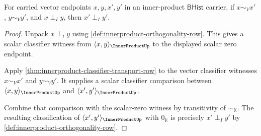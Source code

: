 \begin{theorem}
\label{thm:innerproduct-orthogonality-transport-row}
For carried vector endpoints $x,y,x',y'$ in an inner-product
$\mathsf{BHist}$ carrier, if $x\sim_V x'$, $y\sim_V y'$, and $x\perp_I y$,
then $x'\perp_I y'$.
\end{theorem}
\begin{proof}
Unpack $x\perp_I y$ using
\autoref{def:innerproduct-orthogonality-row}. This gives a scalar classifier
witness from $\langle x,y\rangle_{\InnerProductUp}$ to the displayed scalar
zero endpoint.

Apply \autoref{thm:innerproduct-classifier-transport-row} to the vector
classifier witnesses $x\sim_V x'$ and $y\sim_V y'$. It supplies a scalar
classifier comparison between $\langle x,y\rangle_{\InnerProductUp}$ and
$\langle x',y'\rangle_{\InnerProductUp}$.

Combine that comparison with the scalar-zero witness by transitivity of
$\sim_{\mathbb{K}}$. The resulting classification of
$\langle x',y'\rangle_{\InnerProductUp}$ with $0_{\mathbb{K}}$ is precisely
$x'\perp_I y'$ by \autoref{def:innerproduct-orthogonality-row}.
\end{proof}

